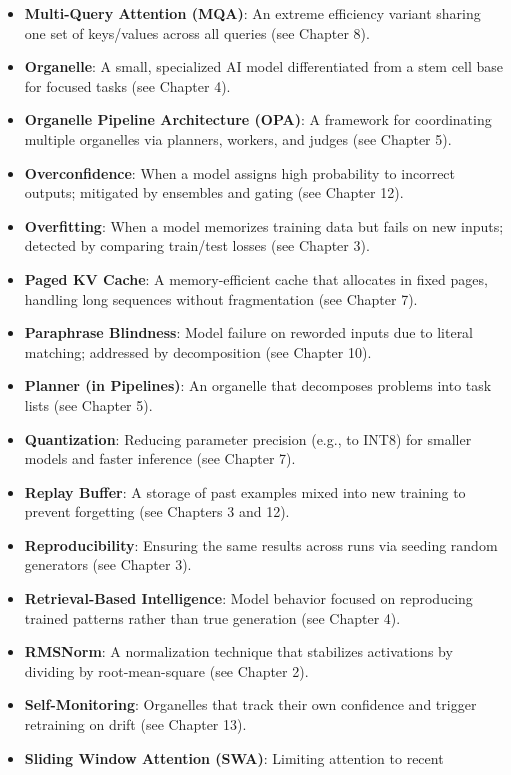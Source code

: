 \documentclass[
]{article}
\begin{document}
\begin{itemize}
\item
  \textbf{Multi-Query Attention (MQA)}: An extreme efficiency variant
  sharing one set of keys/values across all queries (see Chapter 8).
\item
  \textbf{Organelle}: A small, specialized AI model differentiated from
  a stem cell base for focused tasks (see Chapter 4).
\item
  \textbf{Organelle Pipeline Architecture (OPA)}: A framework for
  coordinating multiple organelles via planners, workers, and judges
  (see Chapter 5).
\item
  \textbf{Overconfidence}: When a model assigns high probability to
  incorrect outputs; mitigated by ensembles and gating (see Chapter 12).
\item
  \textbf{Overfitting}: When a model memorizes training data but fails
  on new inputs; detected by comparing train/test losses (see Chapter
  3).
\item
  \textbf{Paged KV Cache}: A memory-efficient cache that allocates in
  fixed pages, handling long sequences without fragmentation (see
  Chapter 7).
\item
  \textbf{Paraphrase Blindness}: Model failure on reworded inputs due to
  literal matching; addressed by decomposition (see Chapter 10).
\item
  \textbf{Planner (in Pipelines)}: An organelle that decomposes problems
  into task lists (see Chapter 5).
\item
  \textbf{Quantization}: Reducing parameter precision (e.g., to INT8)
  for smaller models and faster inference (see Chapter 7).
\item
  \textbf{Replay Buffer}: A storage of past examples mixed into new
  training to prevent forgetting (see Chapters 3 and 12).
\item
  \textbf{Reproducibility}: Ensuring the same results across runs via
  seeding random generators (see Chapter 3).
\item
  \textbf{Retrieval-Based Intelligence}: Model behavior focused on
  reproducing trained patterns rather than true generation (see Chapter
  4).
\item
  \textbf{RMSNorm}: A normalization technique that stabilizes
  activations by dividing by root-mean-square (see Chapter 2).
\item
  \textbf{Self-Monitoring}: Organelles that track their own confidence
  and trigger retraining on drift (see Chapter 13).
\item
  \textbf{Sliding Window Attention (SWA)}: Limiting attention to recent

\end{itemize}
\end{document}
